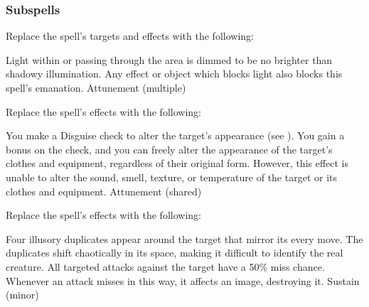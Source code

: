 \subsubsection{Subspells}
Replace the spell's targets and effects with the following:
\begin{spellcontent}
\begin{augmenttargetinginfo}
\end{augmenttargetinginfo}
\begin{augmenteffects}
\spelleffect
Light within or passing through the area is dimmed to be no brighter than shadowy illumination.
Any effect or object which blocks light also blocks this spell's emanation.
\spelldur Attunement (multiple)
\end{augmenteffects}
\end{spellcontent}
Replace the spell's effects with the following:
\begin{spellcontent}
\begin{augmenteffects}
\spelleffect
You make a Disguise check to alter the target's appearance (see ).
You gain a  bonus on the check, and you can freely alter the appearance of the target's clothes and equipment, regardless of their original form.
However, this effect is unable to alter the sound, smell, texture, or temperature of the target or its clothes and equipment.
\spelldur Attunement (shared)
\end{augmenteffects}
\end{spellcontent}
Replace the spell's effects with the following:
\begin{spellcontent}
\begin{augmenteffects}
\spelleffect
Four illusory duplicates appear around the target that mirror its every move.
The duplicates shift chaotically in its space, making it difficult to identify the real creature.
All targeted attacks against the target have a 50\% miss chance.
Whenever an attack misses in this way, it affects an image, destroying it.
\spelldur Sustain (minor)
\end{augmenteffects}
\end{spellcontent}
